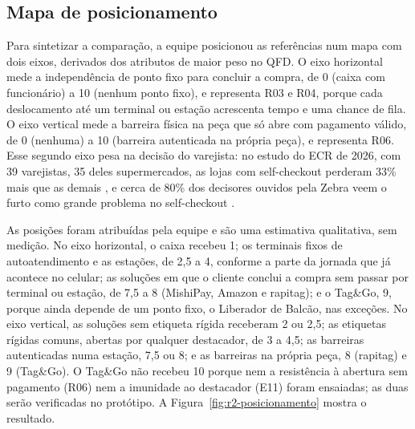 \subsection{Mapa de posicionamento}
\label{sub:r2-dif-mapa}

Para sintetizar a comparação, a equipe posicionou as referências num mapa com dois eixos, derivados dos atributos de maior peso no QFD. O eixo horizontal mede a independência de ponto fixo para concluir a compra, de 0 (caixa com funcionário) a 10 (nenhum ponto fixo), e representa R03 e R04, porque cada deslocamento até um terminal ou estação acrescenta tempo e uma chance de fila. O eixo vertical mede a barreira física na peça que só abre com pagamento válido, de 0 (nenhuma) a 10 (barreira autenticada na própria peça), e representa R06. Esse segundo eixo pesa na decisão do varejista: no estudo do ECR de 2026, com 39 varejistas, 35 deles supermercados, as lojas com self-checkout perderam 33\% mais que as demais \cite{ecr2026selfcheckout}, e cerca de 80\% dos decisores ouvidos pela Zebra veem o furto como grande problema no self-checkout \cite{zebra2023shopper}.

As posições foram atribuídas pela equipe e são uma estimativa qualitativa, sem medição. No eixo horizontal, o caixa recebeu 1; os terminais fixos de autoatendimento e as estações, de 2,5 a 4, conforme a parte da jornada que já acontece no celular; as soluções em que o cliente conclui a compra sem passar por terminal ou estação, de 7,5 a 8 (MishiPay, Amazon e rapitag); e o Tag\&Go, 9, porque ainda depende de um ponto fixo, o Liberador de Balcão, nas exceções. No eixo vertical, as soluções sem etiqueta rígida receberam 2 ou 2,5; as etiquetas rígidas comuns, abertas por qualquer destacador, de 3 a 4,5; as barreiras autenticadas numa estação, 7,5 ou 8; e as barreiras na própria peça, 8 (rapitag) e 9 (Tag\&Go). O Tag\&Go não recebeu 10 porque nem a resistência à abertura sem pagamento (R06) nem a imunidade ao destacador (E11) foram ensaiadas; as duas serão verificadas no protótipo. A Figura~\ref{fig:r2-posicionamento} mostra o resultado.


